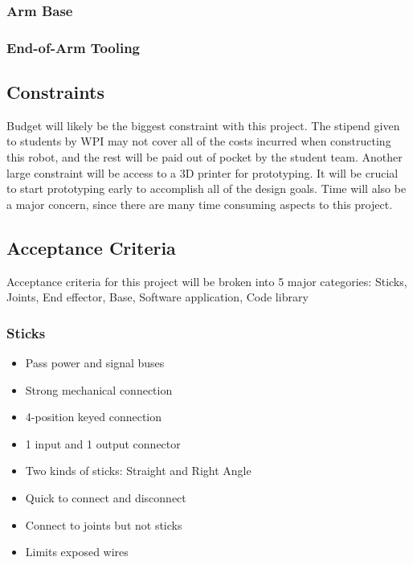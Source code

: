 \subsubsection{Arm Base}

\subsubsection{End-of-Arm Tooling}


\subsection{Constraints}

Budget will likely be the biggest constraint with this project. The stipend given to students by WPI may not cover all of the costs incurred when constructing this robot, and the rest will be paid out of pocket by the student team. Another large constraint will be access to a 3D printer for prototyping. It will be crucial to start prototyping early to accomplish all of the design goals. Time will also be a major concern, since there are many time consuming aspects to this project.

\subsection{Acceptance Criteria}
Acceptance criteria for this project will be broken into 5 major categories: Sticks, Joints, End effector, Base, Software application, Code library

\subsubsection{Sticks}
\begin{itemize}
	\item Pass power and signal buses
	\item Strong mechanical connection
	\item 4-position keyed connection
	\item 1 input and 1 output connector
	\item Two kinds of sticks: Straight and Right Angle
	\item Quick to connect and disconnect
	\item Connect to joints but not sticks
	\item Limits exposed wires
\end{itemize}

